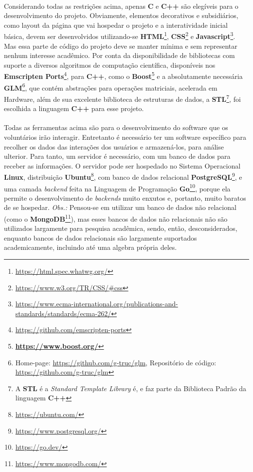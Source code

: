 \documentclass{article}
\begin{document}
	\paragraph{}
	Considerando todas as restrições acima, apenas \textbf{C} e \textbf{C++} são elegíveis para o desenvolvimento do projeto. Obviamente, elementos decorativos e subsidiários, como layout da página que vai hospedar o projeto e a interatividade inicial básica, devem ser desenvolvidos utilizando-se \textbf{HTML}\footnote{\url{https://html.spec.whatwg.org/}}, \textbf{CSS}\footnote{\url{https://www.w3.org/TR/CSS/\#css}} e \textbf{Javascript}\footnote{\url{https://www.ecma-international.org/publications-and-standards/standards/ecma-262/}}. Mas essa parte de código do projeto deve se manter mínima e sem representar nenhum interesse acadêmico. Por conta da disponibilidade de bibliotecas com suporte a diversos algoritmos de computação científica, disponíveis nos \textbf{Emscripten Ports}\footnote{\url{https://github.com/emscripten-ports}}, para \textbf{C++}, como o \textbf{Boost}\footnote{\textbf{\url{https://www.boost.org/}}} e a absolutamente necessária \textbf{GLM}\footnote{Home-page: \url{https://github.com/g-truc/glm}, Repositório de código: \url{https://github.com/g-truc/glm}}, que contém abstrações para operações matriciais, acelerada em Hardware, além de sua excelente biblioteca de estruturas de dados, a \textbf{STL}\footnote{A \textbf{STL} é a \textit{Standard Template Library} é, e faz parte da Biblioteca Padrão da linguagem \textbf{C++}}, foi escolhida a linguagem \textbf{C++} para esse projeto.
	
	\paragraph{}
	Todas as ferramentas acima são para o desenvolvimento do software que os voluntários irão interagir. Entretanto é necessário ter um software específico para recolher os dados das interações dos usuários e armazená-los, para análise ulterior. Para tanto, um servidor é necessário, com um banco de dados para receber as informações. O servidor pode ser hospedado no Sistema Operacional \textbf{Linux}\textregistered, distribuição \textbf{Ubuntu}\texttrademark\footnote{\url{https://ubuntu.com/}}, com banco de dados relacional \textbf{PostgreSQL}\footnote{\url{https://www.postgresql.org/}}, e uma camada \textit{backend} feita na Linguagem de Programação \textbf{Go}\footnote{\url{https://go.dev/}}, porque ela permite o desenvolvimento de \textit{backends} muito enxutos e, portanto, muito baratos de se hospedar. \textit{Obs.:} Pensou-se em utilizar um banco de dados não relacional (como o \textbf{MongoDB}\footnote{\url{https://www.mongodb.com/}}), mas esses bancos de dados não relacionais não são utilizados largamente para pesquisa acadêmica, sendo, então, desconsiderados, enquanto bancos de dados relacionais são largamente suportados academicamente, incluindo até uma algebra própria deles.
	
\end{document}
